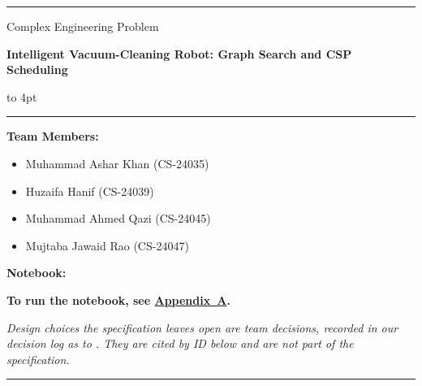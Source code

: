 \documentclass[11pt]{article}
\begin{document}
{\raggedright
\noindent\rule{\linewidth}{0.6pt}\par
\vspace{6pt}
{\fontsize{11}{13}\selectfont Complex Engineering Problem\par}
\vspace{4pt}
{\fontsize{14}{17}\selectfont\bfseries Intelligent Vacuum-Cleaning Robot: Graph Search and CSP Scheduling\par}
\vspace{10pt}
{\color{black!50}\noindent\leaders\hbox to 4pt{\hss\rule{1pt}{1pt}\hss}\hfill\null\par}
\vspace{10pt}
{\fontsize{11}{13}\selectfont
\textbf{Team Members:}\par
\vspace{-2pt}
\begin{itemize}[itemsep=5pt,topsep=2pt,parsep=0pt,leftmargin=1.4em]
  \item Muhammad Ashar Khan (CS-24035)
  \item Huzaifa Hanif (CS-24039)
  \item Muhammad Ahmed Qazi (CS-24045)
  \item Mujtaba Jawaid Rao (CS-24047)
\end{itemize}
\vspace{6pt}
\textbf{Notebook:} \par
\vspace{4pt}
\textbf{To run the notebook, see \hyperref[app:run]{Appendix~A}.}\par
\vspace{10pt}
\itshape Design choices the specification leaves open are team decisions, recorded in our
decision log as  to . They are cited by ID below and are not part of the
specification.\par}
\vspace{6pt}
\noindent\rule{\linewidth}{0.6pt}\par}


\titlespacing*{\section}{0pt}{24pt}{4pt}
\titlespacing*{\section}{0pt}{24pt}{4pt}









\appendix
\newpage

\newpage

\end{document}
